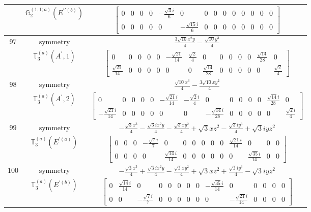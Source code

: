 \documentclass[fleqn,8pt,landscape]{jsarticle}
\begin{document}
\begin{longtable}{ccc}
$  $ & $ \mathbb{G}_{2}^{(1,1;a)}(E^{\prime\prime(b)}) $ & $ \begin{bmatrix} 0 & 0 & 0 & 0 & - \frac{\sqrt{3} i}{6} & 0 & 0 & 0 & 0 & 0 & 0 & 0 & 0 & 0 \\ 0 & 0 & 0 & 0 & 0 & - \frac{\sqrt{15} i}{6} & 0 & 0 & 0 & 0 & 0 & 0 & 0 & 0 \end{bmatrix} $ \\ \hline
$ 97 $ & $ \text{symmetry} $ & $ \frac{3 \sqrt{10} x^{2} y}{4} - \frac{\sqrt{10} y^{3}}{4} $ \\
$  $ & $ \mathbb{T}_{3}^{(a)}(A^{\prime},1) $ & $ \begin{bmatrix} 0 & 0 & 0 & 0 & 0 & - \frac{\sqrt{21}}{14} & \frac{\sqrt{2}}{4} & 0 & 0 & 0 & 0 & 0 & \frac{\sqrt{14}}{28} & 0 \\ \frac{\sqrt{21}}{14} & 0 & 0 & 0 & 0 & 0 & 0 & \frac{\sqrt{14}}{28} & 0 & 0 & 0 & 0 & 0 & \frac{\sqrt{2}}{4} \end{bmatrix} $ \\ \hline
$ 98 $ & $ \text{symmetry} $ & $ \frac{\sqrt{10} x^{3}}{4} - \frac{3 \sqrt{10} x y^{2}}{4} $ \\
$  $ & $ \mathbb{T}_{3}^{(a)}(A^{\prime},2) $ & $ \begin{bmatrix} 0 & 0 & 0 & 0 & 0 & - \frac{\sqrt{21} i}{14} & - \frac{\sqrt{2} i}{4} & 0 & 0 & 0 & 0 & 0 & \frac{\sqrt{14} i}{28} & 0 \\ - \frac{\sqrt{21} i}{14} & 0 & 0 & 0 & 0 & 0 & 0 & - \frac{\sqrt{14} i}{28} & 0 & 0 & 0 & 0 & 0 & \frac{\sqrt{2} i}{4} \end{bmatrix} $ \\ \hline
$ 99 $ & $ \text{symmetry} $ & $ - \frac{\sqrt{3} x^{3}}{4} - \frac{\sqrt{3} i x^{2} y}{4} - \frac{\sqrt{3} x y^{2}}{4} + \sqrt{3} x z^{2} - \frac{\sqrt{3} i y^{3}}{4} + \sqrt{3} i y z^{2} $ \\
$  $ & $ \mathbb{T}_{3}^{(a)}(E^{\prime(a)}) $ & $ \begin{bmatrix} 0 & 0 & 0 & - \frac{\sqrt{7} i}{7} & 0 & 0 & 0 & 0 & 0 & 0 & \frac{\sqrt{21} i}{14} & 0 & 0 & 0 \\ 0 & 0 & 0 & 0 & \frac{\sqrt{14} i}{14} & 0 & 0 & 0 & 0 & 0 & 0 & \frac{\sqrt{35} i}{14} & 0 & 0 \end{bmatrix} $ \\ \hline
$ 100 $ & $ \text{symmetry} $ & $ - \frac{\sqrt{3} x^{3}}{4} + \frac{\sqrt{3} i x^{2} y}{4} - \frac{\sqrt{3} x y^{2}}{4} + \sqrt{3} x z^{2} + \frac{\sqrt{3} i y^{3}}{4} - \sqrt{3} i y z^{2} $ \\
$  $ & $ \mathbb{T}_{3}^{(a)}(E^{\prime(b)}) $ & $ \begin{bmatrix} 0 & \frac{\sqrt{14} i}{14} & 0 & 0 & 0 & 0 & 0 & 0 & - \frac{\sqrt{35} i}{14} & 0 & 0 & 0 & 0 & 0 \\ 0 & 0 & - \frac{\sqrt{7} i}{7} & 0 & 0 & 0 & 0 & 0 & 0 & - \frac{\sqrt{21} i}{14} & 0 & 0 & 0 & 0 \end{bmatrix} $ \\ \hline

\end{longtable}
\end{document}

